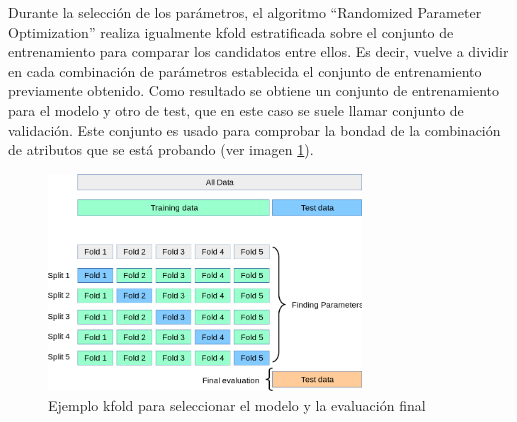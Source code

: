 Durante la selección de los parámetros, el algoritmo ``Randomized Parameter Optimization'' realiza igualmente \gls{kfold}  estratificada sobre el conjunto de entrenamiento para comparar los candidatos entre ellos. Es decir, vuelve a dividir en cada combinación de parámetros establecida el conjunto de entrenamiento previamente obtenido. Como resultado se obtiene un conjunto de entrenamiento para el modelo y otro de test, que en este caso se suele llamar conjunto de validación. Este conjunto es usado para comprobar la bondad de la combinación de atributos que se está probando (ver imagen \ref{figure:kfold}).

\begin{figure}[H]
\centering
\includegraphics[width=0.74\textwidth]{figs/experimentos/kfold.png}
\caption{Ejemplo \gls{kfold} para seleccionar el modelo y la evaluación final \cite{GitHubCompleto}}
\label{figure:kfold}
\end{figure}
